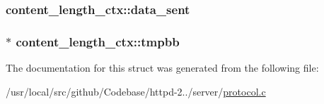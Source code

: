 \subsubsection[{\texorpdfstring{data\+\_\+sent}{data_sent}}]{ content\+\_\+length\+\_\+ctx\+::data\+\_\+sent}\hypertarget{structcontent__length__ctx_ac040425bbff5b78b072997df210991d4}{}\label{structcontent__length__ctx_ac040425bbff5b78b072997df210991d4}
\subsubsection[{\texorpdfstring{tmpbb}{tmpbb}}]{$\ast$ content\+\_\+length\+\_\+ctx\+::tmpbb}\hypertarget{structcontent__length__ctx_afd2c78cf7cd2dcd4fb0926cf2313967d}{}\label{structcontent__length__ctx_afd2c78cf7cd2dcd4fb0926cf2313967d}


The documentation for this struct was generated from the following file\+:\begin{DoxyCompactItemize}
\item 
/usr/local/src/github/\+Codebase/httpd-\/2../server/\hyperlink{protocol_8c}{protocol.\+c}\end{DoxyCompactItemize}
